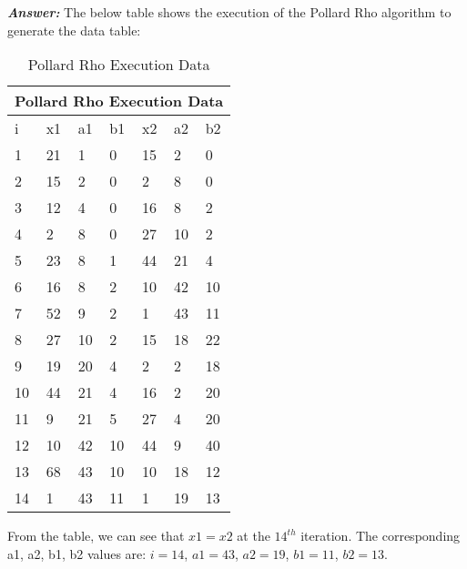 \documentclass[11pt,a4paper,fleqn]{article}
\begin{document}
\begin{enumerate}[1.]
		\begin{flushleft}
			\textbf{\textit{Answer:}} The below table shows the execution of the Pollard Rho algorithm to generate the data table:
			\begin{table}[H]
				\begin{adjustbox}{scale=0.9,center}
				\begin{tabular}{ |p{2cm}|p{2cm}|p{2cm}|p{2cm}||p{2cm}|p{2cm}|p{2cm}| }
				\hline
				\multicolumn{7}{|c|}{Pollard Rho Execution Data} \\
				\hline
				i & x1 & a1 & b1 & x2 & a2 & b2 \\ \hline
				1 & 21 & 1 & 0 & 15 & 2 & 0 \\ \hline
				2 & 15 & 2 & 0 & 2 & 8 & 0 \\ \hline
				3 & 12 & 4 & 0 & 16 & 8 & 2 \\ \hline
				4 & 2 & 8 & 0 & 27 & 10 & 2 \\ \hline
				5 & 23 & 8 & 1 & 44 & 21 & 4 \\ \hline
				6 & 16 & 8 & 2 & 10 & 42 & 10 \\ \hline
				7 & 52 & 9 & 2 & 1 & 43 & 11 \\ \hline
				8 & 27 & 10 & 2 & 15 & 18 & 22 \\ \hline
				9 & 19 & 20 & 4 & 2 & 2 & 18 \\ \hline
				10 & 44 & 21 & 4 & 16 & 2 & 20 \\ \hline
				11 & 9 & 21 & 5 & 27 & 4 & 20 \\ \hline
				12 & 10 & 42 & 10 & 44 & 9 & 40 \\ \hline
				13 & 68 & 43 & 10 & 10 & 18 & 12 \\ \hline
				14 & 1 & 43 & 11 & 1 & 19 & 13 \\ \hline
				\end{tabular}
				\end{adjustbox}
				\caption{Pollard Rho Execution Data}
				\label{table:pollards-rho}
			\end{table}

			From the table, we can see that $x1 = x2$ at the $14^{th}$ iteration. The corresponding a1, a2, b1, b2 values are: $i = 14$, $a1 = 43$, $a2 = 19$, $b1 = 11$, $b2 = 13$.


\end{flushleft}
\end{enumerate}
\end{document}
